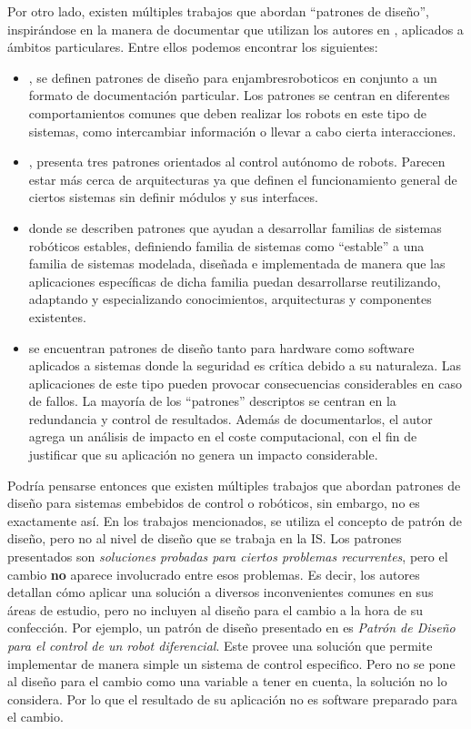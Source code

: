Por otro lado, existen múltiples trabajos que abordan ``patrones de diseño'',  inspirándose en la manera de documentar que utilizan los autores en \cite{Gamma:1995:DPE:186897}, aplicados a ámbitos particulares. Entre ellos podemos encontrar los siguientes:

\begin{itemize}
\item \cite{enjambre}, se definen patrones de diseño para \gls{enjambresroboticos} en conjunto a un formato de documentación particular. Los patrones se centran en diferentes comportamientos comunes que deben realizar los robots en este tipo de sistemas, como intercambiar información o llevar a cabo cierta interacciones.

\item \cite{patterns_2013}, presenta tres patrones orientados al control autónomo de robots. Parecen estar más cerca de arquitecturas ya que definen el funcionamiento general de ciertos sistemas sin definir módulos y sus interfaces.

\item \cite{stable} donde se describen patrones que ayudan a desarrollar familias de sistemas robóticos estables, definiendo familia de sistemas como ``estable'' a una familia de sistemas modelada, diseñada e implementada de manera que las aplicaciones específicas de dicha familia puedan desarrollarse reutilizando, adaptando y especializando conocimientos, arquitecturas y componentes existentes.

\item \cite{critical} se encuentran patrones de diseño tanto para hardware como software aplicados a sistemas donde la seguridad es crítica debido a su naturaleza. Las aplicaciones de este tipo pueden provocar consecuencias considerables en caso de fallos. La mayoría de los ``patrones'' descriptos se centran en la redundancia y control de resultados. Además de documentarlos, el autor agrega un análisis de impacto en el coste computacional, con el fin de justificar que su aplicación no genera un impacto considerable.

\end{itemize}

Podría pensarse entonces que existen múltiples trabajos que abordan patrones de diseño para sistemas embebidos de control o robóticos, sin embargo, no es exactamente así. En los trabajos mencionados, se utiliza el concepto de patrón de diseño, pero no al nivel de diseño que se trabaja en la IS. Los patrones presentados son \textit{soluciones probadas para ciertos problemas recurrentes}, pero el cambio \textbf{no} aparece involucrado entre esos problemas. Es decir, los autores detallan cómo aplicar una solución a diversos inconvenientes comunes en sus áreas de estudio, pero no incluyen al diseño para el cambio a la hora de su confección. Por ejemplo, un patrón de diseño presentado en \cite{robotArg} es \textit{Patrón de Diseño para el control de un robot diferencial}. Este provee una solución que permite implementar de manera simple un sistema de control especifico. Pero no se pone al diseño para el cambio como una variable a tener en cuenta, la solución no lo considera. Por lo que el resultado de su aplicación no es software preparado para el cambio.

